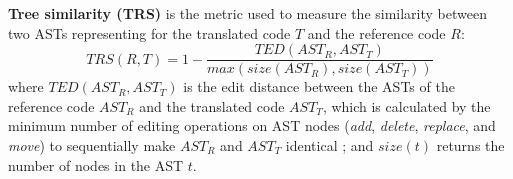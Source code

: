 \textbf{Tree similarity (TRS)} is the metric used to measure
the similarity between two ASTs representing for the translated code $T$
and the reference code $R$:
$$TRS(R, T) = 1 -\frac{TED(AST_R, AST_T)}{max\left(size(AST_R),
  size(AST_T)\right)}$$ where $TED(AST_R, AST_T)$ is the edit
distance between the ASTs of the reference code $AST_R$ and the
translated code $AST_T$, which is calculated by the minimum number of
editing operations on AST nodes ({\em add}, {\em delete}, {\em
  replace}, and {\em move}) to sequentially make $AST_R$ and $AST_T$
identical \cite{oopsla10}; and $size(t)$ returns the number of
nodes in the AST $t$.
%
%
%

%

